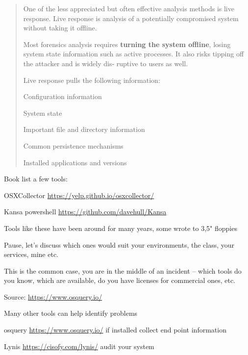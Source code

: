 \documentclass[Screen16to9,17pt]{foils}
\begin{document}
\begin{quote}
One of the less appreciated but often effective analysis methods is live response. Live
response is analysis of a potentially compromised system without taking it offline.

Most forensics analysis requires {\bf turning the system offline}, losing system state information such as active processes. It also risks tipping off the attacker and is widely dis‐
ruptive to users as well.

Live response pulls the following information:
\begin{list2}
\item Configuration information
\item System state
\item Important file and directory information
\item Common persistence mechanisms
\item Installed applications and versions
\end{list2}
\end{quote}



Book list a few tools:
\begin{list2}
\item OSXCollector \url{https://yelp.github.io/osxcollector/}
\item Kansa powershell \url{https://github.com/davehull/Kansa}
\item Tools like these have been around for many years, some wrote to 3,5" floppies
\end{list2}

Pause, let's discuss which ones would suit your environments, the class, your services, mine etc.

This is the common case, you are in the middle of an incident -- which tools do you know, which are available, do you have licenses for commercial ones, etc.


Source: \url{https://www.osquery.io/}

Many other tools can help identify problems
\begin{list2}
\item osquery \url{https://www.osquery.io/} if installed collect end point information
\item Lynis \url{https://cisofy.com/lynis/} audit your system
\end{list2}
\end{document}
